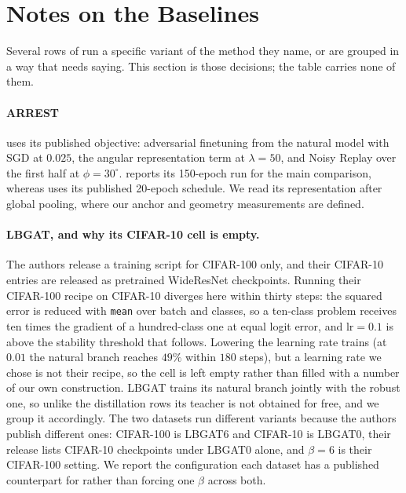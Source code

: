 \section{Notes on the Baselines}
\label{app:baselines}

Several rows of  run a specific variant of the method they name, or are grouped in a
way that needs saying. This section is those decisions; the table carries none of them.

\paragraph{ARREST} uses its published objective: adversarial finetuning from the natural model with
SGD at $0.025$, the angular representation term at $\lambda = 50$, and Noisy Replay over the first
half at $\phi = 30^\circ$.  reports its 150-epoch run for the main comparison, whereas
 uses its published 20-epoch schedule.
We read its representation after global pooling, where our anchor and geometry measurements are
defined.

\paragraph{LBGAT, and why its CIFAR-10 cell is empty.} The authors release a training script for
CIFAR-100 only, and their CIFAR-10 entries are released as pretrained WideResNet checkpoints. Running
their CIFAR-100 recipe on CIFAR-10 diverges here within thirty steps: the squared error is reduced
with \texttt{mean} over batch and classes, so a ten-class problem receives ten times the gradient of
a hundred-class one at equal logit error, and $\mathrm{lr} = 0.1$ is above the stability threshold
that follows. Lowering the learning rate trains (at $0.01$ the natural branch reaches $49\%$ within
$180$ steps), but a learning rate we chose is not their recipe, so the cell is left empty rather than
filled with a number of our own construction. LBGAT trains its natural branch jointly with the robust
one, so unlike the distillation
rows its teacher is not obtained for free, and we group it accordingly. The two datasets run different
variants because the authors publish different ones: CIFAR-100 is LBGAT6 and CIFAR-10 is LBGAT0, their
release lists CIFAR-10 checkpoints under LBGAT0 alone, and $\beta = 6$ is their CIFAR-100 setting. We
report the configuration each dataset has a published counterpart for rather than forcing one $\beta$
across both.

